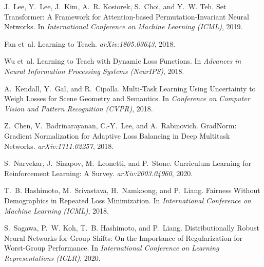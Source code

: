 \documentclass[11pt]{article}
\newcommand{\1}{\mathbf{1}}
\begin{document}
\begin{thebibliography}{30}
J.~Lee, Y.~Lee, J.~Kim, A.~R. Kosiorek, S.~Choi, and Y.~W. Teh.
\newblock Set Transformer: A Framework for Attention-based Permutation-Invariant Neural Networks.
\newblock In \emph{International Conference on Machine Learning (ICML)}, 2019.

Fan et~al.
\newblock Learning to Teach.
\newblock \emph{arXiv:1805.03643}, 2018.

Wu et~al.
\newblock Learning to Teach with Dynamic Loss Functions.
\newblock In \emph{Advances in Neural Information Processing Systems (NeurIPS)}, 2018.

A.~Kendall, Y.~Gal, and R.~Cipolla.
\newblock Multi-Task Learning Using Uncertainty to Weigh Losses for Scene Geometry and Semantics.
\newblock In \emph{Conference on Computer Vision and Pattern Recognition (CVPR)}, 2018.

Z.~Chen, V.~Badrinarayanan, C.-Y.~Lee, and A.~Rabinovich.
\newblock GradNorm: Gradient Normalization for Adaptive Loss Balancing in Deep Multitask Networks.
\newblock \emph{arXiv:1711.02257}, 2018.

S.~Narvekar, J.~Sinapov, M.~Leonetti, and P.~Stone.
\newblock Curriculum Learning for Reinforcement Learning: A Survey.
\newblock \emph{arXiv:2003.04960}, 2020.

T.~B. Hashimoto, M.~Srivastava, H.~Namkoong, and P.~Liang.
\newblock Fairness Without Demographics in Repeated Loss Minimization.
\newblock In \emph{International Conference on Machine Learning (ICML)}, 2018.

S.~Sagawa, P.~W. Koh, T.~B. Hashimoto, and P.~Liang.
\newblock Distributionally Robust Neural Networks for Group Shifts: On the Importance of Regularization for Worst-Group Performance.
\newblock In \emph{International Conference on Learning Representations (ICLR)}, 2020.

\end{thebibliography}
\end{document}
